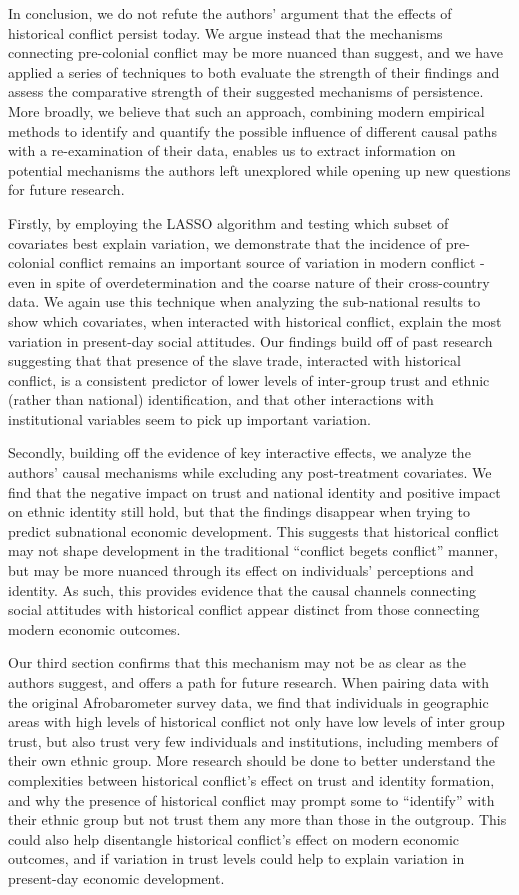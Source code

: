 In conclusion, we do not refute the authors' argument that the effects of historical conflict persist today. We argue instead that the mechanisms connecting pre-colonial conflict may be more nuanced than \cite{BesleyRQ2014} suggest, and we have applied a series of techniques to both evaluate the strength of their findings and assess the comparative strength of their suggested mechanisms of persistence. More broadly, we believe that such an approach, combining modern empirical methods to identify and quantify the possible influence of different causal paths with a re-examination of their data, enables us to extract information on potential mechanisms the authors left unexplored while opening up new questions for future research. 

Firstly, by employing the LASSO algorithm and testing which subset of covariates best explain variation, we demonstrate that the incidence of pre-colonial conflict remains an important source of variation in modern conflict - even in spite of overdetermination and the coarse nature of their cross-country data. We again use this technique when analyzing the sub-national results to show which covariates, when interacted with historical conflict, explain the most variation in present-day social attitudes. Our findings build off of past research suggesting that that presence of the slave trade, interacted with historical conflict, is a consistent predictor of lower levels of inter-group trust and ethnic (rather than national) identification, and that other interactions with institutional variables seem to pick up important variation.

Secondly, building off the evidence of key interactive effects, we analyze the authors' causal mechanisms while excluding any post-treatment covariates. We find that the negative impact on trust and national identity and positive impact on ethnic identity still hold, but that the findings disappear when trying to predict subnational economic development. This suggests that historical conflict may not shape development in the traditional ``conflict begets conflict'' manner, but may be more nuanced through its effect on individuals' perceptions and identity. As such, this provides evidence that the causal channels connecting social attitudes with historical conflict appear distinct from those connecting modern economic outcomes. 

Our third section confirms that this mechanism may not be as clear as the authors suggest, and offers a path for future research. When pairing \cite{BesleyRQ2014} data with the original Afrobarometer survey data, we find that individuals in geographic areas with high levels of historical conflict not only have low levels of inter group trust, but also trust very few individuals and institutions, including members of their own ethnic group. More research should be done to better understand the complexities between historical conflict's effect on trust and identity formation, and why the presence of historical conflict may prompt some to ``identify'' with their ethnic group but not trust them any more than those in the outgroup. This could also help disentangle historical conflict's effect on modern economic outcomes, and if variation in trust levels could help to explain variation in present-day economic development.